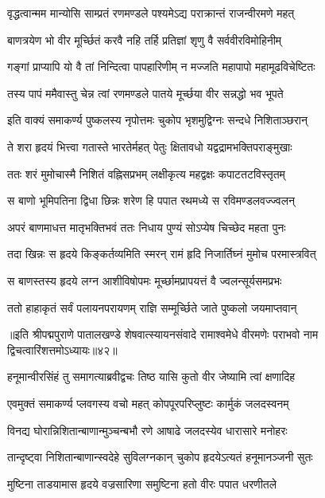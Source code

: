 \twolineshloka
{वृद्धत्वान्मम मान्योसि साम्प्रतं रणमण्डले}
{पश्यमेऽद्य पराक्रान्तं राजन्वीरमणे महत्}%

\twolineshloka
{बाणत्रयेण भो वीर मूर्च्छितं करवै नहि}
{तर्हि प्रतिज्ञां शृणु वै सर्ववीरविमोहिनीम्}%

\twolineshloka
{गङ्गां प्राप्यापि यो वै तां निन्दित्वा पापहारिणीम्}
{न मज्जति महापापो महामूढविचेष्टितः}%

\twolineshloka
{तस्य पापं ममैवास्तु चेन्न त्वां रणमण्डले}
{पातये मूर्च्छया वीर सन्नद्धो भव भूपते}%

\twolineshloka
{इति वाक्यं समाकर्ण्य पुष्कलस्य नृपोत्तमः}
{चुकोप भृशमुद्विग्नः सन्दधे निशिताञ्छरान्}%

\twolineshloka
{ते शरा हृदयं भित्त्वा गतास्ते भारतेर्महत्}
{पेतुः क्षितावधो यद्वद्रामभक्तिपराङ्मुखाः}%

\twolineshloka
{ततः शरं मुमोचास्मै निशितं वह्निसप्रभम्}
{लक्षीकृत्य महद्वक्षः कपाटतटविस्तृतम्}%

\twolineshloka
{स बाणो भूमिपतिना द्विधा छिन्नः शरेण हि}
{पपात रथमध्ये स रविमण्डलवज्ज्वलन्}%

\twolineshloka
{अपरं बाणमाधत्त मातृभक्तिभवं ततः}
{निधाय पुण्यं सोऽप्येष चिच्छेद महता पुनः}%

\twolineshloka
{तदा खिन्नः स हृदये किङ्कर्तव्यमिति स्मरन्}
{रामं हृदि निजार्तिघ्नं मुमोच परमास्त्रवित्}%

\twolineshloka
{स बाणस्तस्य हृदये लग्न आशीविषोपमः}
{मूर्च्छामप्रापयत्तं वै ज्वलन्सूर्यसमप्रभः}%

\twolineshloka
{ततो हाहाकृतं सर्वं पलायनपरायणम्}
{राज्ञि सम्मूर्च्छिते जाते पुष्कलो जयमाप्तवान्}%

॥इति श्रीपद्मपुराणे पातालखण्डे शेषवात्स्यायनसंवादे रामाश्वमेधे वीरमणेः पराभवो नाम द्विचत्वारिंशत्तमोऽध्यायः॥४२॥



\twolineshloka
{हनूमान्वीरसिंहं तु समागत्याब्रवीद्वचः}
{तिष्ठ यासि कुतो वीर जेष्यामि त्वां क्षणादिह}%

\twolineshloka
{एवमुक्तं समाकर्ण्य प्लवगस्य वचो महत्}
{कोपपूरपरिप्लुष्टः कार्मुकं जलदस्वनम्}%

\twolineshloka
{विनद्य घोरान्निशितान्बाणान्मुञ्चन्बभौ रणे}
{आषाढे जलदस्येव धारासारे मनोहरः}%

\twolineshloka
{तान्दृष्ट्वा निशितान्बाणान्स्वदेहे सुविलग्नकान्}
{चुकोप हृदयेऽत्यतं हनूमानञ्जनी सुतः}%

\twolineshloka
{मुष्टिना ताडयामास हृदये वज्रसारिणा}
{समुष्टिना हतो वीरः पपात धरणीतले}%


